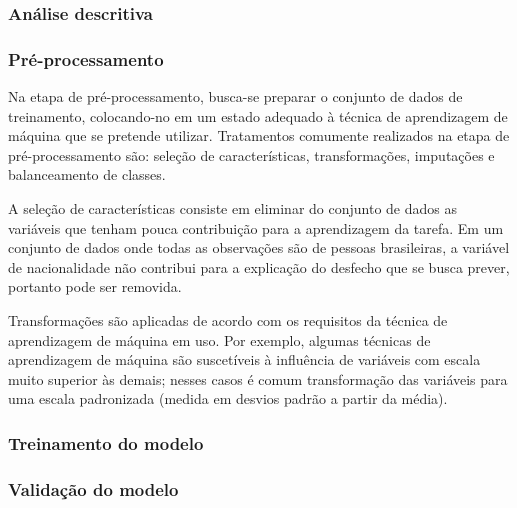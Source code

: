 \subsubsection{Análise descritiva}
\subsubsection{Pré-processamento}
Na etapa de pré-processamento, busca-se preparar o conjunto de dados de treinamento, colocando-no em um estado adequado à técnica
de aprendizagem de máquina que se pretende utilizar. Tratamentos comumente realizados na etapa de pré-processamento são: seleção de
características, transformações, imputações e balanceamento de classes.

A seleção de características consiste em eliminar do conjunto de dados as variáveis que tenham pouca contribuição para a aprendizagem da tarefa.
Em um conjunto de dados onde todas as observações são de pessoas brasileiras, a variável de nacionalidade não contribui para a explicação do desfecho
que se busca prever, portanto pode ser removida.

Transformações são aplicadas de acordo com os requisitos da técnica de aprendizagem de máquina em uso. Por exemplo, algumas técnicas de aprendizagem
de máquina são suscetíveis à influência de variáveis com escala muito superior às demais; nesses casos é comum transformação das variáveis para uma escala
padronizada (medida em desvios padrão a partir da média).

\subsubsection{Treinamento do modelo}
\subsubsection{Validação do modelo}
